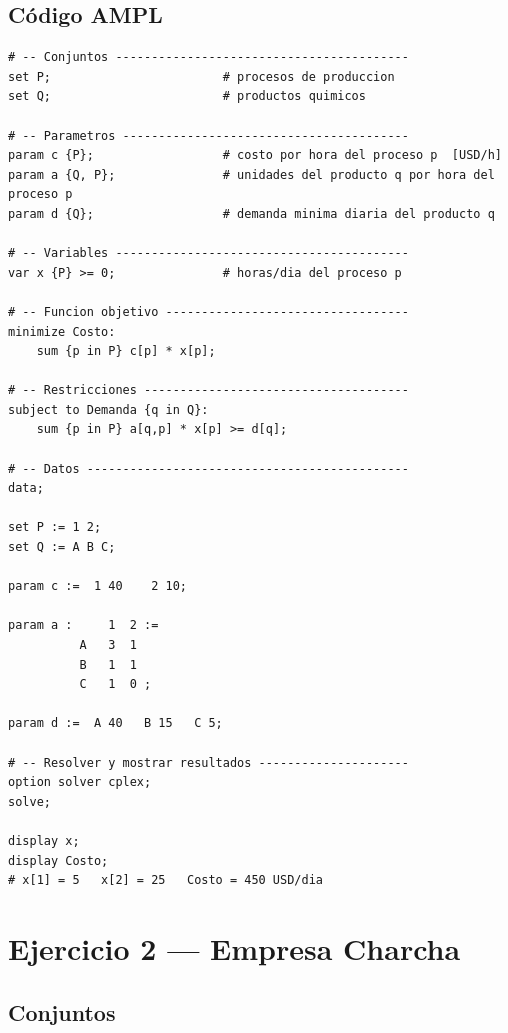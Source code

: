 \documentclass[12pt,a4paper]{article}
\begin{document}
\subsection{Código AMPL}
\begin{lstlisting}[caption={La Química -- Modelo AMPL}]
# -- Conjuntos -----------------------------------------
set P;                        # procesos de produccion
set Q;                        # productos quimicos

# -- Parametros ----------------------------------------
param c {P};                  # costo por hora del proceso p  [USD/h]
param a {Q, P};               # unidades del producto q por hora del proceso p
param d {Q};                  # demanda minima diaria del producto q

# -- Variables -----------------------------------------
var x {P} >= 0;               # horas/dia del proceso p

# -- Funcion objetivo ----------------------------------
minimize Costo:
    sum {p in P} c[p] * x[p];

# -- Restricciones -------------------------------------
subject to Demanda {q in Q}:
    sum {p in P} a[q,p] * x[p] >= d[q];

# -- Datos ---------------------------------------------
data;

set P := 1 2;
set Q := A B C;

param c :=  1 40    2 10;

param a :     1  2 :=
          A   3  1
          B   1  1
          C   1  0 ;

param d :=  A 40   B 15   C 5;

# -- Resolver y mostrar resultados ---------------------
option solver cplex;
solve;

display x;
display Costo;
# x[1] = 5   x[2] = 25   Costo = 450 USD/dia
\end{lstlisting}

\clearpage
\section{Ejercicio 2 — Empresa Charcha}

\subsection{Conjuntos}
\end{document}
